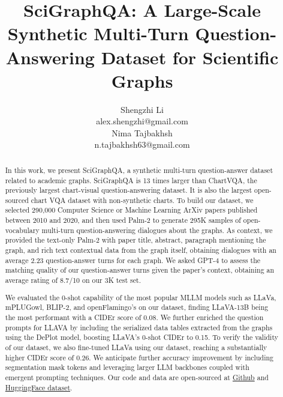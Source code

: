 \documentclass{article}
\title{SciGraphQA: A Large-Scale Synthetic Multi-Turn Question-Answering Dataset for Scientific Graphs}
\author{
    Shengzhi Li \\
    alex.shengzhi@gmail.com \\
   \And
    Nima Tajbakhsh \\
    n.tajbakhsh63@gmail.com \\
}
\begin{document}
\maketitle

\begin{abstract}

In this work, we present SciGraphQA, a synthetic multi-turn question-answer dataset related to academic graphs. SciGraphQA is 13
times larger than ChartVQA, the previously largest chart-visual question-answering dataset. It is also
the largest open-sourced chart VQA dataset with non-synthetic charts. To build our dataset, we selected 290,000 Computer Science or Machine Learning ArXiv papers published between 2010 and 2020, and then used Palm-2 to generate 295K samples of open-vocabulary multi-turn question-answering dialogues about the graphs. As context, we provided the text-only Palm-2 with paper title, abstract, paragraph mentioning the graph, and rich text contextual data from the graph itself, obtaining dialogues with an average 2.23 question-answer turns for each graph. We asked GPT-4 to assess the matching quality of our question-answer turns given the paper's context, obtaining an average rating of 8.7/10 on our 3K test set. 

We evaluated the 0-shot capability of the most popular MLLM models such as LLaVa, mPLUGowl, BLIP-2, and openFlamingo's on our dataset, finding LLaVA-13B being the most performant with a CIDEr score of 0.08. We further enriched the question prompts for LLAVA by including the serialized data tables extracted from the graphs using the DePlot model, boosting LLaVA's 0-shot CIDEr to 0.15. To verify the validity of our dataset, we also fine-tuned LLaVa using our dataset, reaching a substantially higher CIDEr score of 0.26. We anticipate further accuracy improvement by including segmentation mask tokens and leveraging larger LLM backbones coupled with emergent prompting techniques. Our code and data are open-sourced at \hyperlink{https://github.com/findalexli/SciGraphQA}{Github} and \hyperlink{https://huggingface.co/datasets/alexshengzhili/SciGraphQA-295K-train}{HuggingFace dataset}.


\end{abstract}
\end{document}
